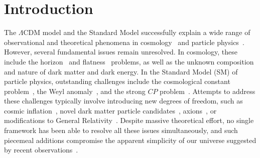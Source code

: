 \documentclass[12pt,a4paper]{report}
\let\cite\parencite
\begin{document}

\tableofcontents
\clearpage

\listoffigures
{}
\clearpage


\chapter{Introduction}\label{chapter:introduction}

The $\Lambda$CDM model and the Standard Model successfully explain a wide range of observational and theoretical phenomena in cosmology~\cite{2020A&A...641A...6P} and particle physics~\cite{1995iqft.book.....P}. However, several fundamental issues remain unresolved. In cosmology, these include the horizon~\cite{1972grun.book.....D} and flatness~\cite{1983Natur.305..673C} problems, as well as the unknown composition and nature of dark matter and dark energy. In the Standard Model (SM) of particle physics, outstanding challenges include the cosmological constant problem~\cite{1989RvMP...61....1W}, the Weyl anomaly~\cite{1994CQGra..11.1387D}, and the strong $CP$ problem~\cite{1976PhRvL..37....8T}. Attempts to address these challenges typically involve introducing new degrees of freedom, such as cosmic inflation~\cite{1981PhRvD..23..347G}, novel dark matter particle candidates~\cite{2019Univ....5..213P}, axions~\cite{1977PhRvL..38.1440P}, or modifications to General Relativity~\cite{2012PhR...513....1C}. Despite massive theoretical effort, no single framework has been able to resolve all these issues simultaneously, and such piecemeal additions compromise the apparent simplicity of our universe suggested by recent observations~\cite{2020A&A...641A...6P, 2024ApJ...966..157F}.
\end{document}
